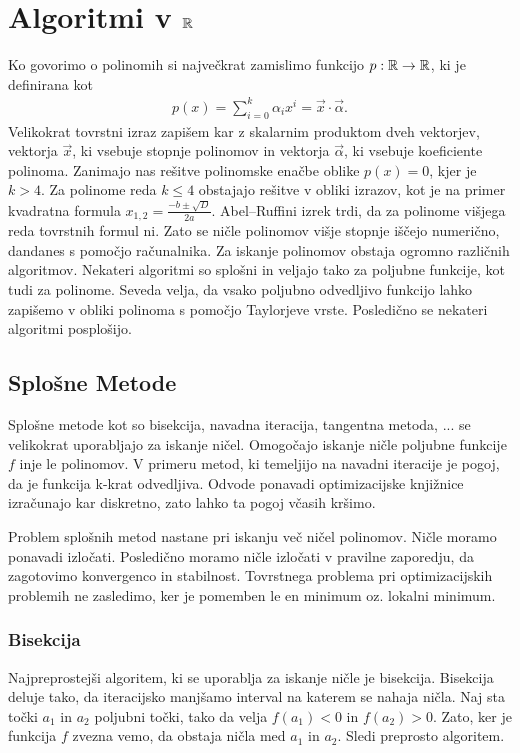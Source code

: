 \chapter{Algoritmi v $\mathbb{R}$}
Ko govorimo o polinomih si največkrat zamislimo funkcijo $p: \mathbb{R} \to \mathbb{R}$, ki je definirana kot
\begin{align}
    p(x) = \sum_{i=0}^k \alpha_i x^i = \Vec{x} \cdot \Vec{\alpha}.
\end{align}
Velikokrat tovrstni izraz zapišem kar z skalarnim produktom dveh vektorjev, vektorja $\Vec{x}$, ki vsebuje stopnje polinomov in vektorja $\Vec{\alpha}$, ki vsebuje koeficiente polinoma. Zanimajo nas rešitve polinomske enačbe oblike $p(x) = 0$, kjer je $k > 4$. Za polinome reda $k \le 4$ obstajajo rešitve v obliki izrazov, kot je na primer kvadratna formula $x_{1,2} = \frac{-b \pm \sqrt{D}}{2a}$. Abel–Ruffini izrek \cite{Ramond_2022} trdi, da za polinome višjega reda tovrstnih formul ni. Zato se ničle polinomov višje stopnje iščejo numerično, dandanes s pomočjo računalnika. Za iskanje polinomov obstaja ogromno različnih algoritmov. Nekateri algoritmi so splošni in veljajo tako za poljubne funkcije, kot tudi za polinome. Seveda velja, da vsako poljubno odvedljivo funkcijo lahko zapišemo v obliki polinoma s pomočjo Taylorjeve vrste. Posledično se nekateri algoritmi posplošijo.
\section{Splošne Metode}
Splošne metode kot so bisekcija, navadna iteracija, tangentna metoda, ... se velikokrat uporabljajo za iskanje ničel. Omogočajo iskanje ničle poljubne funkcije $f$ inje le polinomov. V primeru metod, ki temeljijo na navadni iteracije je pogoj, da je funkcija k-krat odvedljiva. Odvode ponavadi optimizacijske knjižnice izračunajo kar diskretno, zato lahko ta pogoj včasih kršimo. 

Problem splošnih metod nastane pri iskanju več ničel polinomov. Ničle moramo ponavadi izločati. Posledično moramo ničle izločati v pravilne zaporedju, da zagotovimo konvergenco in stabilnost. Tovrstnega problema pri optimizacijskih problemih ne zasledimo, ker je pomemben le en minimum oz. lokalni minimum.
\subsection{Bisekcija}
Najpreprostejši algoritem, ki se uporablja za iskanje ničle je bisekcija. Bisekcija deluje tako, da iteracijsko manjšamo interval na katerem se nahaja ničla. Naj sta točki $a_1$ in $a_2$ poljubni točki, tako da velja $f(a_1) < 0$ in $f(a_2) > 0$. Zato, ker je funkcija $f$ zvezna vemo, da obstaja ničla med $a_1$ in $a_2$. Sledi preprosto algoritem. 

